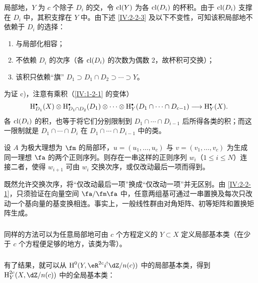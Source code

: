 局部地，$Y$ 为 $c$ 个除子 $D_i$ 的交，令 $\operatorname{cl}(Y)$ 为各 $\operatorname{cl}(D_i)$ 的杯积。由于 $\operatorname{cl}(D_i)$ 支撑在 $D_i$ 中，其积支撑在 $Y$ 中。由下述 \ref{IV:2-2-3} 及以下不变性，可知该积局部地不依赖于 $D_i$ 的选择：
\begin{enumerate}[\indent a)]
\item 与局部化相容；
\item 不依赖 $D_i$ 的次序（各 $\operatorname{cl}(D_i)$ 的次数为偶数 $2$，故杯积可交换）；
\item 该积只依赖“旗” $D_1\supset D_1\cap D_2\supset\cdots\supset Y$。
\end{enumerate}
为证 c)，注意有乘积（\ref{IV:1-2-1} 的变体）
\[
\h_{D_1}^\bullet(X)\otimes\h_{D_1\cap D_2}^\bullet(D_1)\otimes\cdots\otimes
\h_Y^\bullet(D_1\cap\cdots\cap D_{c-1})\longrightarrow\h_Y^\bullet(X).
\]
各 $\operatorname{cl}(D_i)$ 的积，也等于将它们分别限制到 $D_1\cap\cdots\cap D_{i-1}$ 后所得各类的积；而这一限制就是 $D_1\cap\cdots\cap D_i$ 在 $D_1\cap\cdots\cap D_{i-1}$ 中的类。

\begin{lemma}\label{IV:2-2-3}
设 $A$ 为极大理想为 $\fm$ 的局部环，$u=(u_1,\dots,u_c)$ 与 $v=(v_1,\dots,v_c)$ 为生成同一理想 $\fa$ 的两个正则序列。则存在一串这样的正则序列 $w_i$（$1\leqslant i\leqslant N$）连接二者，使得 $w_{i+1}$ 可由 $w_i$ 交换次序，或仅改动最后一项而得到。
\end{lemma}
既然允许交换次序，将“仅改动最后一项”换成“仅改动一项”并无区别。由 \ref{IV:2-2-1}，只须验证在向量空间 $\fa/\fm\fa$ 中，任意两组基可通过一串置换及每次只改动一个基向量的基变换相连。事实上，一般线性群由对角矩阵、初等矩阵和置换矩阵生成。

\subsubsection{}\label{IV:2-2-4}
同样的方法可以为任意局部地可由 $c$ 个方程定义的 $Y\subset X$ 定义局部基本类（在少于 $c$ 个方程便足够的地方，该类为零）。

\subsubsection{}\label{IV:2-2-5}
有了结果，就可以从 $\h^0(Y,\eR^{2c}i^!\dZ/n(c))$ 中的局部基本类，得到 $\h_Y^{2c}(X,\dZ/n(c))$ 中的全局基本类：

